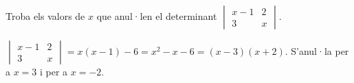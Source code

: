 \begin{apartats}
\begin{nomesllarg}
Troba els valors de $x$ que anul·len el determinant $\begin{vmatrix}x-1&2\\3&x\end{vmatrix}$.

\begin{solucio}
$\begin{vmatrix}x-1&2\\3&x\end{vmatrix}=x(x-1)-6=x^2-x-6=(x-3)(x+2)$. S'anul·la per a $x=3$ i per a
$x=-2$.
\end{solucio}
\end{nomesllarg}

\end{apartats}
